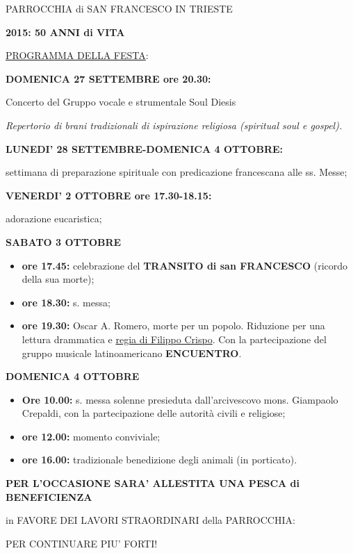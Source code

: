 \documentclass[17pt,titlepage,extrafontsizes]{memoir}
\begin{document}
\pagestyle{empty}
\begin{center}
{\LARGE PARROCCHIA di SAN FRANCESCO IN TRIESTE\par
\vspace{1cm}
\textbf{2015: 50 ANNI di VITA}}
\end{center}
\vfill
{\Large \ul{PROGRAMMA DELLA FESTA}:}
\par\bigskip\bigskip
\textbf{\Large DOMENICA 27 SETTEMBRE ore 20.30:}
\par\medskip
{\large Concerto del  Gruppo vocale e strumentale Soul Diesis\par}
\textit{Repertorio di brani tradizionali di ispirazione religiosa (spiritual soul e gospel).}
\par\bigskip\bigskip
\textbf{\Large LUNEDI’ 28 SETTEMBRE-DOMENICA 4 OTTOBRE:}
\par\medskip
{\large settimana di preparazione spirituale con predicazione francescana alle ss. Messe;}
\par\bigskip\bigskip
\textbf{\Large VENERDI’ 2 OTTOBRE ore 17.30-18.15:}
\par\medskip
{\large adorazione eucaristica;}
\par\bigskip\bigskip
\textbf{\Large SABATO 3 OTTOBRE}
\par\medskip
\begin{itemize}
 \large
 \item \textbf{ore 17.45:} celebrazione del \textbf{TRANSITO di san FRANCESCO} (ricordo della sua morte);
 \item \textbf{ore 18.30:} s. messa;
 \item \textbf{ore 19.30:} Oscar A. Romero, morte per un popolo. Riduzione per una lettura drammatica e \ul{regia di Filippo Crispo}. Con la partecipazione del gruppo musicale latinoamericano \textbf{ENCUENTRO}.
\end{itemize}
\par\bigskip\bigskip
\textbf{\Large DOMENICA 4 OTTOBRE}
\par\medskip
\begin{itemize}
 \large
 \item \textbf{Ore 10.00:} s. messa solenne presieduta dall’arcivescovo mons. Giampaolo Crepaldi, con la partecipazione delle autorità civili e religiose;
 \item \textbf{ore 12.00:} momento conviviale;
 \item \textbf{ore 16.00:} tradizionale benedizione degli animali (in porticato).
\end{itemize}
\vfill
\begin{center}
\large\bfseries 
PER L’OCCASIONE SARA’ ALLESTITA UNA PESCA di BENEFICIENZA\par
in FAVORE DEI LAVORI STRAORDINARI della PARROCCHIA:\par
\Large PER CONTINUARE PIU’ FORTI!
\end{center}
\vfill
\newpage
\end{document}
